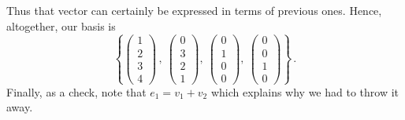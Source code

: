 {Thus that vector can certainly be expressed in terms of previous ones. Hence, altogether, our basis is
\[
\left\{
\begin{pmatrix}1\\2\\3\\4\end{pmatrix} \, , \ 
\begin{pmatrix}0\\3\\2\\1\end{pmatrix} ,\
\begin{pmatrix}0\\1\\0\\0\end{pmatrix} ,\
\begin{pmatrix}0\\0\\1\\0\end{pmatrix}
\right\}\, .
\]
Finally, as a check, note that $e_1=v_1+v_2$ which explains why we had to throw it away.



} %


